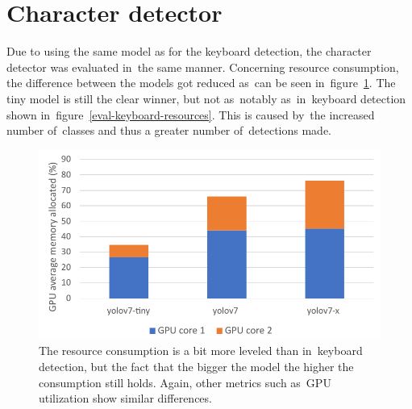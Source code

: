 \section{Character detector}
\label{evaluation-chars}
Due to using the same model as for the keyboard detection, the character detector was evaluated in~the same manner. Concerning resource consumption, the difference between the models got reduced as~can be seen in~figure~\ref{eval-char-resources}. The tiny model is still the clear winner, but not as~notably as~in~keyboard detection shown in~figure~\ref{eval-keyboard-resources}. This is caused by~the increased number of~classes and thus a greater number of~detections made.

\begin{figure}[hbt]
    \includegraphics[width=1\textwidth]{img/evaluation/eval-char-resources.pdf}
    \caption{The resource consumption is a bit more leveled than in~keyboard detection, but the fact that the bigger the model the higher the consumption still holds. Again, other metrics such as~GPU utilization show similar differences.}
    \label{eval-char-resources}
\end{figure}

